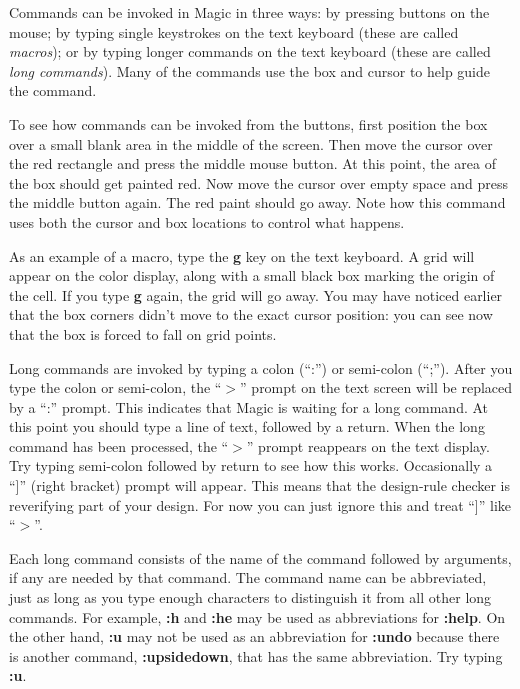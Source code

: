 \documentclass[letterpaper,twoside,12pt]{article}
\begin{document}
Commands can be invoked in Magic in three ways:  by pressing
buttons on the mouse;  by typing single keystrokes on the
text keyboard (these are called
{\itshape macros}); or by typing longer commands on the text
keyboard (these are called {\itshape long commands}).  Many of the
commands use the box and cursor to help guide the command.

To see how commands can be invoked from the buttons, first
position the box over a small blank area in the middle of the
screen.  Then move the cursor over the red rectangle and
press the middle mouse button.  At this point, the area of the box should
get painted red.  Now move the cursor over empty space and
press the middle button again.  The red paint should go away.
Note how this command uses both the cursor and box locations
to control what happens.

As an example of a macro, type the {\bfseries g} key on
the text keyboard.  A grid will appear on the color display, along
with a small black box marking the origin of the cell.
If you type {\bfseries g} again, the grid will go away.  You
may have noticed earlier that the box corners didn't move to
the exact cursor position:  you can see now that the box is
forced to fall on grid points.

Long commands are invoked by typing a colon (``:'') or
semi-colon (``;'').  After you
type the colon or semi-colon, the ``$>$'' prompt on the text
screen will be replaced by a ``:'' prompt.  This indicates
that Magic is waiting for a long command.  At this point
you should type a line of text, followed by a return.
When the long command has been processed, the ``$>$'' prompt
reappears on the text display.  Try typing semi-colon followed by
return to see how this works.  Occasionally a ``]'' (right bracket)
prompt will appear.  This means that the design-rule checker is reverifying
part of your design.  For now you can just ignore this and treat
``]'' like ``$>$''.

Each long command consists of the name of the command followed
by arguments, if any are needed by that command.  The command
name can be abbreviated, just as long as you type enough
characters to distinguish it from all other long commands.
For example, {\bfseries :h} and {\bfseries :he} may be used as abbreviations for
{\bfseries :help}.  On the other hand, {\bfseries :u} may not be used as an
abbreviation for {\bfseries :undo} because there is another command,
{\bfseries :upsidedown}, that has the same abbreviation.  Try typing
{\bfseries :u}.
\end{document}
